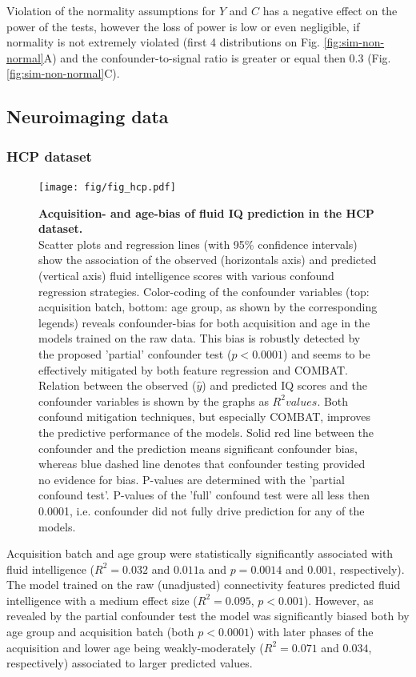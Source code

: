 \documentclass{article}
\begin{document}
Violation of the normality assumptions for $Y$ and $C$ has a negative effect on the power of the tests, however the loss of power is low or even negligible, if normality is not extremely violated (first 4 distributions on Fig. \ref{fig:sim-non-normal}A) and the confounder-to-signal ratio is greater or equal then 0.3 (Fig. \ref{fig:sim-non-normal}C).

\subsection{Neuroimaging data}
\subsubsection*{HCP dataset}

\begin{figure}[!b]
  \centering
  \texttt{[image: fig/fig\_hcp.pdf]}
  \caption{\textbf{Acquisition- and age-bias of fluid IQ prediction in the HCP dataset.} \\
  Scatter plots and regression lines (with 95\% confidence intervals) show the association of the observed (horizontals axis) and predicted (vertical axis) fluid intelligence scores with various confound regression strategies. Color-coding of the confounder variables (top: acquisition batch, bottom: age group, as shown by the corresponding legends) reveals confounder-bias for both acquisition and age in the models trained on the raw data. This bias is robustly detected by the proposed 'partial' confounder test ($p<0.0001$) and seems to be effectively mitigated by both feature regression and COMBAT.
  Relation between the observed ($\hat{y}$) and predicted IQ scores and the confounder variables is shown by the graphs as $R^2 values$. Both confound mitigation techniques, but especially COMBAT, improves the predictive performance of the models.
  Solid red line between the confounder and the prediction means significant confounder bias, whereas blue dashed line denotes that confounder testing provided no evidence for bias. P-values are determined with the 'partial confound test'. P-values of the 'full' confound test were all less then 0.0001, i.e. confounder did not fully drive prediction for any of the models.
  }
  \label{fig:hcp}
\end{figure}

Acquisition batch and age group were statistically significantly associated with fluid intelligence ($R^2=0.032$ and $0.011$a and $p=0.0014$ and $0.001$, respectively). The model trained on the raw (unadjusted) connectivity features predicted fluid intelligence with a medium effect size ($R^2=0.095$, $p<0.001$).
However, as revealed by the partial confounder test the model was significantly biased both by age group and acquisition batch (both $p<0.0001$) with later phases of the acquisition and lower age being weakly-moderately ($R^2=0.071$ and $0.034$, respectively) associated to larger predicted values.
\end{document}
